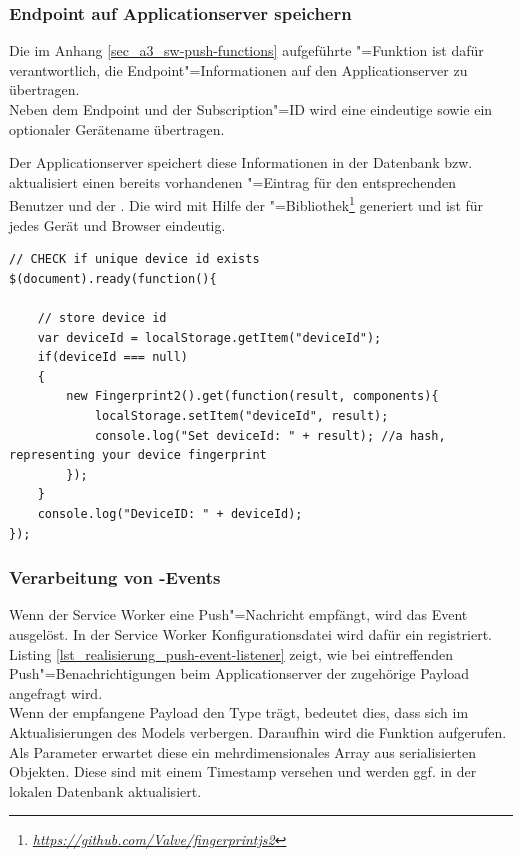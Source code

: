 \subsubsection{Endpoint auf Applicationserver speichern}

Die im Anhang \ref{sec_a3_sw-push-functions} aufgeführte "=Funktion ist dafür verantwortlich, die Endpoint"=Informationen auf den Applicationserver zu übertragen. \\
Neben dem Endpoint und der Subscription"=ID wird eine eindeutige  sowie ein optionaler Gerätename übertragen. 

Der Applicationserver speichert diese Informationen in der Datenbank bzw. aktualisiert einen bereits vorhandenen "=Eintrag für den entsprechenden Benutzer und der . Die  wird mit Hilfe der "=Bibliothek\footnote{\textit{\url{https://github.com/Valve/fingerprintjs2}}} generiert und ist für jedes Gerät und Browser eindeutig. \\ 

\begin{lstlisting}[caption={Bei Seitenstart prüfen, ob eine DeviceID vorhanden ist und ggf. anlegen},label={lst_realisierung_deviceId}, frame=single]
// CHECK if unique device id exists
$(document).ready(function(){

    // store device id
    var deviceId = localStorage.getItem("deviceId");
    if(deviceId === null)
    {
        new Fingerprint2().get(function(result, components){
            localStorage.setItem("deviceId", result);
            console.log("Set deviceId: " + result); //a hash, representing your device fingerprint
        });
    }
    console.log("DeviceID: " + deviceId);
});
\end{lstlisting}

\subsubsection{Verarbeitung von -Events}

Wenn der Service Worker eine Push"=Nachricht empfängt, wird das Event  ausgelöst. In der Service Worker Konfigurationsdatei wird dafür ein  registriert. Listing \ref{lst_realisierung_push-event-listener} zeigt, wie bei eintreffenden Push"=Benachrichtigungen beim Applicationserver der zugehörige Payload angefragt wird. \\
Wenn der empfangene Payload den Type  trägt, bedeutet dies, dass sich im  Aktualisierungen des Models verbergen. Daraufhin wird die Funktion  aufgerufen. Als Parameter erwartet diese ein mehrdimensionales Array aus serialisierten Objekten. Diese sind mit einem Timestamp versehen und werden ggf. in der lokalen Datenbank aktualisiert. \\

